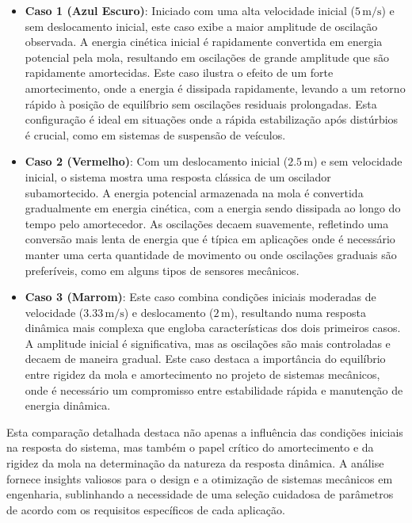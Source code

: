 \begin{itemize}
    \item \textbf{Caso 1 (Azul Escuro)}: Iniciado com uma alta velocidade inicial (\(5 \, \text{m/s}\)) e sem deslocamento inicial, este caso exibe a maior amplitude de oscilação observada. A energia cinética inicial é rapidamente convertida em energia potencial pela mola, resultando em oscilações de grande amplitude que são rapidamente amortecidas. Este caso ilustra o efeito de um forte amortecimento, onde a energia é dissipada rapidamente, levando a um retorno rápido à posição de equilíbrio sem oscilações residuais prolongadas. Esta configuração é ideal em situações onde a rápida estabilização após distúrbios é crucial, como em sistemas de suspensão de veículos.

    \item \textbf{Caso 2 (Vermelho)}: Com um deslocamento inicial (\(2.5 \, \text{m}\)) e sem velocidade inicial, o sistema mostra uma resposta clássica de um oscilador subamortecido. A energia potencial armazenada na mola é convertida gradualmente em energia cinética, com a energia sendo dissipada ao longo do tempo pelo amortecedor. As oscilações decaem suavemente, refletindo uma conversão mais lenta de energia que é típica em aplicações onde é necessário manter uma certa quantidade de movimento ou onde oscilações graduais são preferíveis, como em alguns tipos de sensores mecânicos.

    \item \textbf{Caso 3 (Marrom)}: Este caso combina condições iniciais moderadas de velocidade (\(3.33 \, \text{m/s}\)) e deslocamento (\(2 \, \text{m}\)), resultando numa resposta dinâmica mais complexa que engloba características dos dois primeiros casos. A amplitude inicial é significativa, mas as oscilações são mais controladas e decaem de maneira gradual. Este caso destaca a importância do equilíbrio entre rigidez da mola e amortecimento no projeto de sistemas mecânicos, onde é necessário um compromisso entre estabilidade rápida e manutenção de energia dinâmica.
\end{itemize}

Esta comparação detalhada destaca não apenas a influência das condições iniciais na resposta do sistema, mas também o papel crítico do amortecimento e da rigidez da mola na determinação da natureza da resposta dinâmica. A análise fornece insights valiosos para o design e a otimização de sistemas mecânicos em engenharia, sublinhando a necessidade de uma seleção cuidadosa de parâmetros de acordo com os requisitos específicos de cada aplicação.


